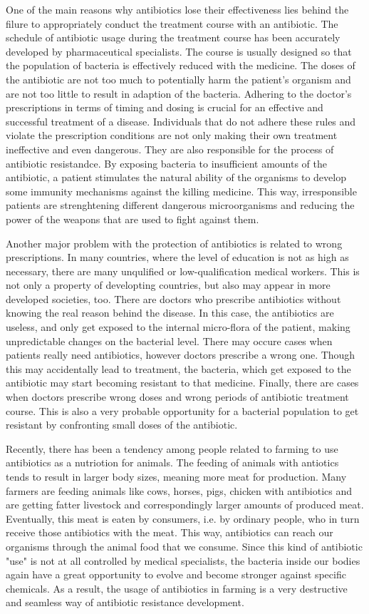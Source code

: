 One of the main reasons why antibiotics lose their effectiveness lies behind the filure to appropriately conduct the treatment course with an antibiotic. The schedule of antibiotic usage during the treatment course has been accurately developed by pharmaceutical specialists. The course is usually designed so that the population of bacteria is effectively reduced with the medicine. The doses of the antibiotic are not too much to potentially harm the patient's organism and are not too little to result in adaption of the bacteria. Adhering to the doctor's prescriptions in terms of timing and dosing is crucial for an effective and successful treatment of a disease. Individuals that do not adhere these rules and violate the prescription conditions are not only making their own treatment ineffective and even dangerous. They are also responsible for the process of antibiotic resistandce. By exposing bacteria to insufficient amounts of the antibiotic, a patient stimulates the natural ability of the organisms to develop some immunity mechanisms against the killing medicine. This way, irresponsible patients are strenghtening different dangerous microorganisms and reducing the power of the weapons that are used to fight against them.

Another major problem with the protection of antibiotics is related to wrong prescriptions. In many countries, where the level of education is not as high as necessary, there are many unqulified or low-qualification medical workers. This is not only a property of developting countries, but also may appear in more developed societies, too. There are doctors who prescribe antibiotics without knowing the real reason behind the disease. In this case, the antibiotics are useless, and only get exposed to the internal micro-flora of the patient, making unpredictable changes on the bacterial level. There may occure cases when patients really need antibiotics, however doctors prescribe a wrong one. Though this may accidentally lead to treatment, the bacteria, which get exposed to the antibiotic may start becoming resistant to that medicine. Finally, there are cases when doctors prescribe wrong doses and wrong periods of antibiotic treatment course. This is also a very probable opportunity for a bacterial population to get resistant by confronting small doses of the antibiotic.

Recently, there has been a tendency among people related to farming to use antibiotics as a nutriotion for animals. The feeding of animals with antiotics tends to result in larger body sizes, meaning more meat for production. Many farmers are feeding animals like cows, horses, pigs, chicken with antibiotics and are getting fatter livestock and correspondingly larger amounts of produced meat. Eventually, this meat is eaten by consumers, i.e. by ordinary people, who in turn receive those antibiotics with the meat. This way, antibiotics can reach our organisms through the animal food that we consume. Since this kind of antibiotic "use" is not at all controlled by medical specialists, the bacteria inside our bodies again have a great opportunity to evolve and become stronger against specific chemicals. As a result, the usage of antibiotics in farming is a very destructive and seamless way of antibiotic resistance development.